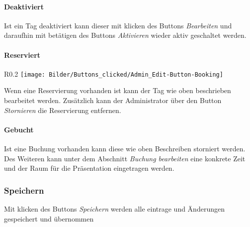 \paragraph{Deaktiviert}
Ist ein Tag deaktiviert kann dieser mit klicken des Buttons \textit{Bearbeiten} und daraufhin mit betätigen des Buttons \textit{Aktivieren} wieder aktiv geschaltet werden.
\\

\paragraph{Reserviert}
\begin{wrapfigure}{R}{0.2\textwidth}
	\centering
	\texttt{[image: Bilder/Buttons\_clicked/Admin\_Edit-Button-Booking]}
\end{wrapfigure}
Wenn eine Reservierung vorhanden ist kann der Tag wie oben beschrieben bearbeitet werden. Zusätzlich kann der Administrator über den Button \textit{Stornieren} die Reservierung entfernen.

\paragraph{Gebucht}
Ist eine Buchung vorhanden kann diese wie oben Beschreiben storniert werden. Des Weiteren kann unter dem Abschnitt \textit{Buchung bearbeiten} eine konkrete Zeit und der Raum für die Präsentation eingetragen werden.  

\subsubsection{Speichern}
Mit klicken des Buttons \textit{Speichern} werden alle eintrage und Änderungen gespeichert und übernommen 
